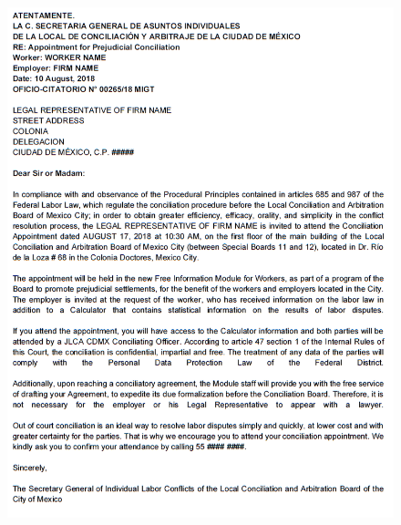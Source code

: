 \begin{figure}[H] 
    \centering
    \includegraphics[width=1\textwidth]{Figures/A2_letter_EN.PNG}
    \label{fig:A2_4_2}
\end{figure}
